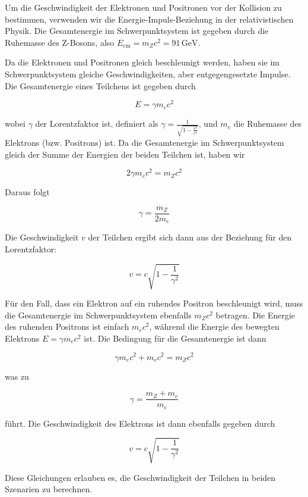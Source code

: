Um die Geschwindigkeit der Elektronen und Positronen vor der Kollision zu bestimmen, verwenden wir die Energie-Impuls-Beziehung in der relativistischen Physik. Die Gesamtenergie im Schwerpunktsystem ist gegeben durch die Ruhemasse des Z-Bosons, also \( E_{\text{cm}} = m_Z c^2 = 91 \, \text{GeV} \).

Da die Elektronen und Positronen gleich beschleunigt werden, haben sie im Schwerpunktsystem gleiche Geschwindigkeiten, aber entgegengesetzte Impulse. Die Gesamtenergie eines Teilchens ist gegeben durch

\[
E = \gamma m_e c^2
\]

wobei \(\gamma\) der Lorentzfaktor ist, definiert als \(\gamma = \frac{1}{\sqrt{1 - \frac{v^2}{c^2}}}\), und \(m_e\) die Ruhemasse des Elektrons (bzw. Positrons) ist. Da die Gesamtenergie im Schwerpunktsystem gleich der Summe der Energien der beiden Teilchen ist, haben wir

\[
2 \gamma m_e c^2 = m_Z c^2
\]

Daraus folgt

\[
\gamma = \frac{m_Z}{2 m_e}
\]

Die Geschwindigkeit \(v\) der Teilchen ergibt sich dann aus der Beziehung für den Lorentzfaktor:

\[
v = c \sqrt{1 - \frac{1}{\gamma^2}}
\]

Für den Fall, dass ein Elektron auf ein ruhendes Positron beschleunigt wird, muss die Gesamtenergie im Schwerpunktsystem ebenfalls \(m_Z c^2\) betragen. Die Energie des ruhenden Positrons ist einfach \(m_e c^2\), während die Energie des bewegten Elektrons \(E = \gamma m_e c^2\) ist. Die Bedingung für die Gesamtenergie ist dann

\[
\gamma m_e c^2 + m_e c^2 = m_Z c^2
\]

was zu

\[
\gamma = \frac{m_Z + m_e}{m_e}
\]

führt. Die Geschwindigkeit des Elektrons ist dann ebenfalls gegeben durch

\[
v = c \sqrt{1 - \frac{1}{\gamma^2}}
\]

Diese Gleichungen erlauben es, die Geschwindigkeit der Teilchen in beiden Szenarien zu berechnen.